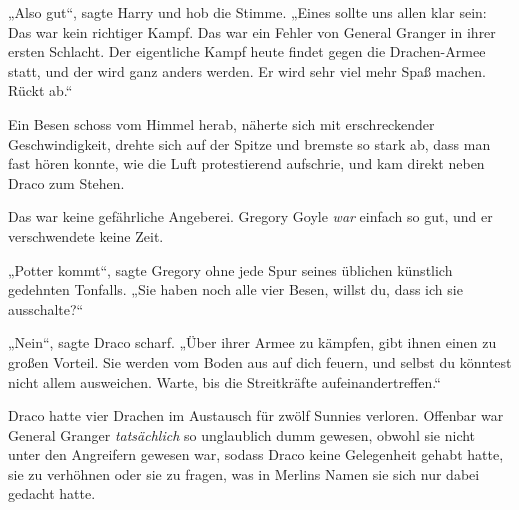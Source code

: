 „Also gut“, sagte Harry und hob die Stimme.
„Eines sollte uns allen klar sein: Das war kein richtiger Kampf. Das war ein Fehler von General Granger in ihrer ersten Schlacht. Der eigentliche Kampf heute findet gegen die Drachen-Armee statt, und der wird ganz anders werden. Er wird sehr viel mehr Spaß machen. Rückt ab.“

\later

Ein Besen schoss vom Himmel herab, näherte sich mit erschreckender Geschwindigkeit, drehte sich auf der Spitze und bremste so stark ab, dass man fast hören konnte, wie die Luft protestierend aufschrie, und kam direkt neben Draco zum Stehen.

Das war keine gefährliche Angeberei. Gregory Goyle \emph{war} einfach so gut, und er verschwendete keine Zeit.

„Potter kommt“, sagte Gregory ohne jede Spur seines üblichen künstlich gedehnten Tonfalls.
„Sie haben noch alle vier Besen, willst du, dass ich sie ausschalte?“

„Nein“, sagte Draco scharf. „Über ihrer Armee zu kämpfen, gibt ihnen einen zu großen Vorteil. Sie werden vom Boden aus auf dich feuern, und selbst du könntest nicht allem ausweichen. Warte, bis die Streitkräfte aufeinandertreffen.“

Draco hatte vier Drachen im Austausch für zwölf Sunnies verloren. Offenbar war General Granger \emph{tatsächlich} so unglaublich dumm gewesen, obwohl sie nicht unter den Angreifern gewesen war, sodass Draco keine Gelegenheit gehabt hatte, sie zu verhöhnen oder sie zu fragen, was in Merlins Namen sie sich nur dabei gedacht hatte.

